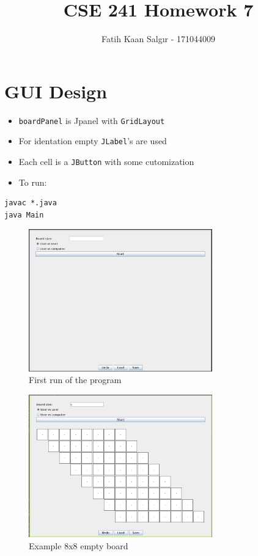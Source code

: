 \documentclass[11pt]{article}
\author{Fatih Kaan Salgır - 171044009}
\date{}
\title{CSE 241 Homework 7}
\begin{document}
\maketitle

\section{GUI Design}
\label{sec:org24faa90}
\begin{itemize}
\item \texttt{boardPanel} is Jpanel with \texttt{GridLayout}
\item For identation empty \texttt{JLabel}'s are used
\item Each cell is a \texttt{JButton} with some cutomization

\item To run:
\end{itemize}
\begin{verbatim}
javac *.java
java Main
\end{verbatim}

\begin{figure}[H]
\centering
\includegraphics[width=300px]{GUI_Design/2021-01-29_14-49-20_screenshot.png}
\caption{First run of the program}
\end{figure}


\begin{figure}[H]
\centering
\includegraphics[width=300px]{GUI_Design/2021-01-29_14-57-47_screenshot.png}
\caption{Example 8x8 empty board}
\end{figure}
\end{document}
